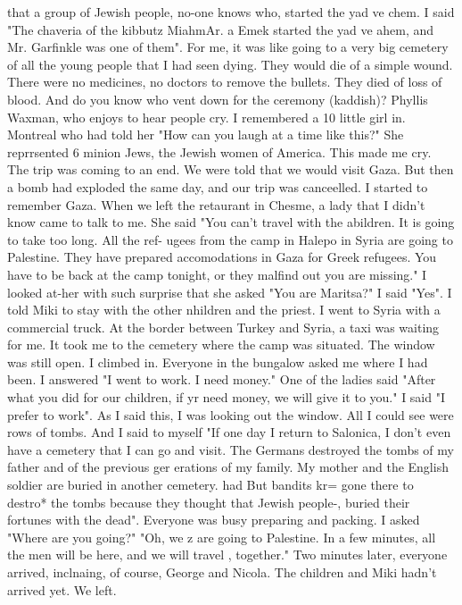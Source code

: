 that a group of Jewish people, no-one knows who, started the yad ve chem. I said "The 
chaveria of the kibbutz MiahmAr. a Emek started the yad ve ahem, and Mr. Garfinkle was one 
of them". For me, it was like going to a very big cemetery of all the young people that 
I had seen dying. They would die of a simple wound. There were no medicines, no doctors 
to remove the bullets. They died of loss of blood. And do you know who vent down for 
the ceremony (kaddish)? Phyllis Waxman, who enjoys to hear people cry. I remembered a 
10 little girl in. Montreal who had told her "How can you laugh at a time like this?" She 
reprrsented 6 minion Jews, the Jewish women of America. This made me cry. 
The trip was coming to an end. We were told that we would visit Gaza. But then a 
bomb had exploded the same day, and our trip was canceelled. I started to remember Gaza. 
When we left the retaurant in Chesme, a lady that I didn't know came to talk to me. 
She said "You can't travel with the abildren. It is going to take too long. All the ref-
ugees from the camp in Halepo in Syria are going to Palestine. They have prepared 
accomodations in Gaza for Greek refugees. You have to be back at the camp tonight, or 
they malfind out you are missing." I looked at-her with such surprise that she asked 
"You are Maritsa?" I said "Yes". 
I told Miki to stay with the other nhildren and the priest. I went to Syria with 
a commercial truck. At the border between Turkey and Syria, a taxi was waiting for me. 
It took me to the cemetery where the camp was situated. The window was still open. I 
climbed in. Everyone in the bungalow asked me where I had been. I answered "I went to 
work. I need money." One of the ladies said "After what you did for our children, if yr 
need money, we will give it to you." I said "I prefer to work". 
As I said this, I was looking out the window. All I could see were rows of tombs. 
And I said to myself "If one day I return to Salonica, I don't even have a cemetery that 
I can go and visit. The Germans destroyed the tombs of my father and of the previous ger 
erations of my family. My mother and the English soldier are buried in another cemetery. 
had 
But bandits kr= gone there to destro* the tombs because they thought that Jewish people-, 
buried their fortunes with the dead". 
Everyone was busy preparing and packing. I asked "Where are you going?" "Oh, we z 
are going to Palestine. In a few minutes, all the men will be here, and we will travel , 
together." Two minutes later, everyone arrived, inclnaing, of course, George and Nicola. 
The children and Miki hadn't arrived yet. We left. 
